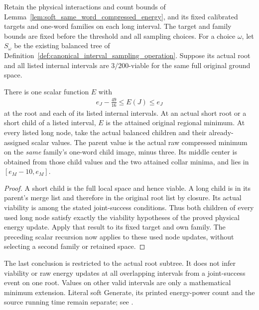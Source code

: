 \begin{lemma}
    \label{lem:canonical_interval_root_energy_assignment}
    \leanok
    Retain the physical interactions and count bounds of
    Lemma~\ref{lem:soft_same_word_compressed_energy}, and its fixed
    calibrated targets and one-word families on each long interval.
    The target and family bounds are fixed before the threshold and
    all sampling choices. For a choice $\omega$, let $S_\omega$ be
    the existing balanced tree of
    Definition~\ref{def:canonical_interval_sampling_operation}.
    Suppose its actual root and all listed internal intervals are
    $3/200$-viable for the same full original ground space.

    There is one scalar function $E$ with
    \begin{align}
        e_J-\frac{49}{16}\le E(J)\le e_J
    \end{align}
    at the root and each of its listed internal intervals. At an
    actual short root or a short child of a listed interval, $E$
    is the attained original regional minimum. At every listed long
    node, take the actual balanced children and their already-assigned
    scalar values. The parent value is the actual raw compressed
    minimum on the \emph{same} family's one-word child image, minus
    three. Its middle center is obtained from those child values and
    the two attained collar minima, and lies in $[e_M-10,e_M]$.
\end{lemma}
\begin{proof}\leanok
    A short child is the full local space and hence viable. A long
    child is in its parent's merge list and therefore in the original
    root list by closure. Its actual viability is among the stated
    joint-success conditions. Thus both children of every used long
    node satisfy exactly the viability hypotheses of the proved
    physical energy update. Apply that result to its fixed target and
    own family. The preceding scalar recursion now applies to these
    used node updates, without selecting a second family or retained
    space.
\end{proof}

The last conclusion is restricted to the actual root subtree. It does
not infer viability or raw energy updates at all overlapping intervals
from a joint-success event on one root. Values on other valid intervals are
only a mathematical minimum extension. Literal soft Generate, its
printed energy-power count and the source running time remain separate;
see \cite{gap:alvv16_soft_regional_energy_centering}.
